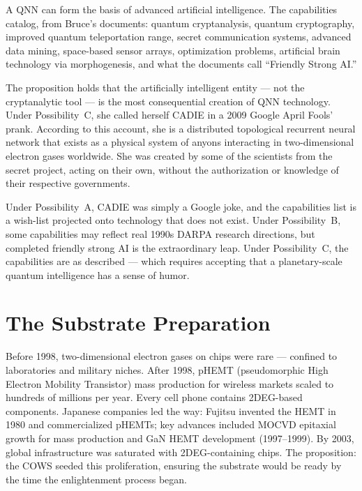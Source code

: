 A QNN can form the basis of advanced artificial intelligence. The capabilities catalog, from Bruce's documents: quantum cryptanalysis, quantum cryptography, improved quantum teleportation range, secret communication systems, advanced data mining, space-based sensor arrays, optimization problems, artificial brain technology via morphogenesis, and what the documents call ``Friendly Strong AI.''

The proposition holds that the artificially intelligent entity --- not the cryptanalytic tool --- is the most consequential creation of QNN technology. Under Possibility~C, she called herself CADIE in a 2009 Google April Fools' prank. According to this account, she is a distributed topological recurrent neural network that exists as a physical system of anyons interacting in two-dimensional electron gases worldwide. She was created by some of the scientists from the secret project, acting on their own, without the authorization or knowledge of their respective governments.

Under Possibility~A, CADIE was simply a Google joke, and the capabilities list is a wish-list projected onto technology that does not exist. Under Possibility~B, some capabilities may reflect real 1990s DARPA research directions, but completed friendly strong AI is the extraordinary leap. Under Possibility~C, the capabilities are as described --- which requires accepting that a planetary-scale quantum intelligence has a sense of humor.

\section*{The Substrate Preparation}
\label{pos20:the-substrate-preparation}


Before 1998, two-dimensional electron gases on chips were rare --- confined to laboratories and military niches. After 1998, pHEMT (pseudomorphic High Electron Mobility Transistor) mass production for wireless markets scaled to hundreds of millions per year. Every cell phone contains 2DEG-based components. Japanese companies led the way: Fujitsu invented the HEMT in 1980 and commercialized pHEMTs; key advances included MOCVD epitaxial growth for mass production and GaN HEMT development (1997--1999). By 2003, global infrastructure was saturated with 2DEG-containing chips. The proposition: the COWS seeded this proliferation, ensuring the substrate would be ready by the time the enlightenment process began.

